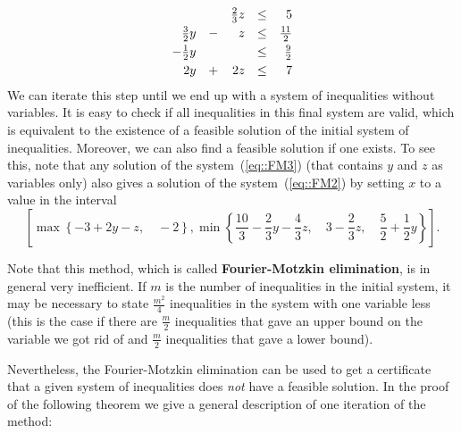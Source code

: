 \documentclass[12pt, showidx, twoside]{article}
\def\hi{\bf}
\begin{document}
{{{{\begin{equation}
\begin{array}{rrrrr}
              &   & \frac{2}{3}z & \leq & 5 \vspace*{1mm}\\
\frac{3}{2}y  & - &            z & \leq & \frac{11}{2} \vspace*{1mm}\\
-\frac{1}{2}y &   &              & \leq & \frac{9}{2} \vspace*{1mm}\\
2y            & + &           2z & \leq & 7 
\end{array}
\end{equation}
We can iterate this step until we end up with a system of inequalities without
variables. It is easy to check if all inequalities in this final system are
valid, which is equivalent to the existence of a feasible solution of the
initial system of inequalities. Moreover, we can also find a feasible solution if
one exists. To see this, note that any solution of the system~(\ref{eq::FM3})
(that contains $y$ and $z$ as variables only) also gives a solution
of the system~(\ref{eq::FM2}) by setting $x$ to a value in the interval
\[
\left[
\max\left\{-3 + 2y - z, \quad
      -2 \right\}, 
\min\left\{\frac{10}{3} - \frac{2}{3}y  - \frac{4}{3}z, \quad
      3 - \frac{2}{3}z, \quad
      \frac{5}{2}  + \frac{1}{2}y
    \right\}
\right].
\]

Note that this method, 
which is called {\hi Fourier-Motzkin elimination},{}
is in general very inefficient. If $m$ is the number of 
inequalities in the initial system, it may be necessary to state $\frac{m^2}{4}$
inequalities in the system with one variable less (this is the case if there
are $\frac{m}{2}$ inequalities that gave an upper bound on the variable
we got rid of and $\frac{m}{2}$ inequalities that gave a lower bound).

Nevertheless, the Fourier-Motzkin elimination
can be used to get a certificate that a given system
of inequalities does {\it not} have a feasible solution. 
In the proof of the following theorem we give a general 
description of one iteration of the method:  

}}}}
\end{document}
